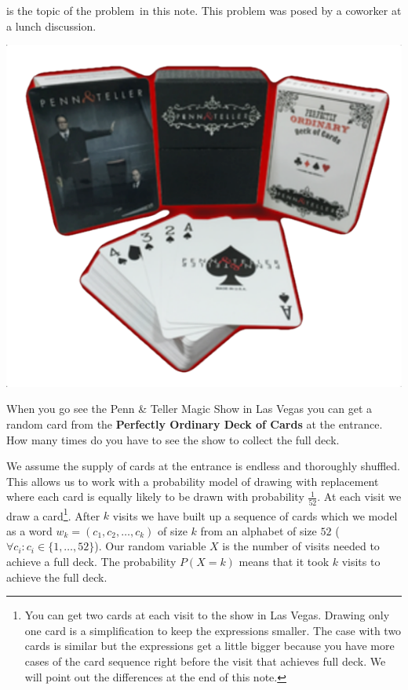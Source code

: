  is the topic of the problem\ in this note. This problem was posed by a coworker at a lunch discussion.

\begin{marginfigure}[0.01in]
\includegraphics[scale=0.5]{cards.pdf}
\end{marginfigure}

\vspace{10 mm}
\begin{problem}
When you go see the Penn \& Teller Magic Show in Las Vegas you can get a random card from the \textbf{Perfectly Ordinary Deck of Cards} at the entrance. How many times do you have to see the show to collect the full deck.
\end{problem}

We assume the supply of cards at the entrance is endless and thoroughly shuffled. This allows us to work with a probability model of drawing with replacement where each card is equally likely to be drawn with probability $\frac{1}{52}$. At each visit we draw a card\footnote{You can get two cards at each visit to the show in Las Vegas. Drawing only one card is a simplification to keep the expressions smaller. The case with two cards is similar but the expressions get a little bigger because you have more cases of the card sequence right before the visit that achieves full deck. We will point out the differences at the end of this note.}.
After $k$ visits we have built up a sequence of cards which we model as a word $w_k=(c_1, c_2, \ldots, c_k)$ of size $k$ from an alphabet of size $52$ ($\forall c_i: c_i \in \{1, \ldots, 52\}$). Our random variable $X$ is the number of visits needed to achieve a full deck. The probability $P(X=k)$ means that it took $k$ visits to achieve the full deck. 

